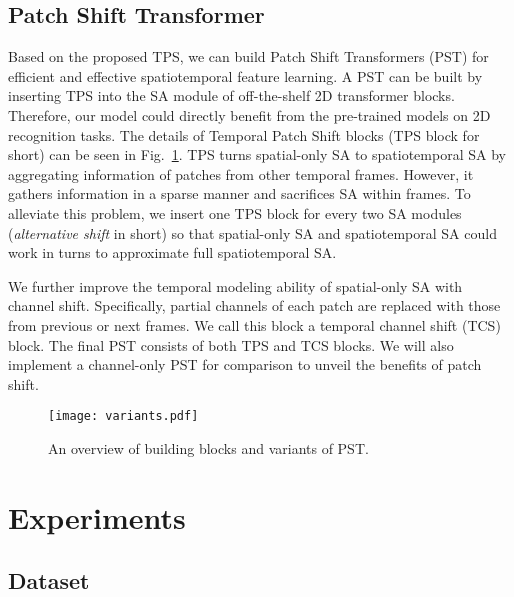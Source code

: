 \documentclass[runningheads]{llncs}
\begin{document}
	
	
	\subsection{Patch Shift Transformer} 
	
	Based on the proposed TPS, we can build Patch Shift Transformers (PST) for efficient and effective spatiotemporal feature learning. A PST can be built by inserting TPS into the SA module of off-the-shelf 2D transformer blocks. Therefore, our model could directly benefit from the pre-trained models on 2D recognition tasks. The details of Temporal Patch Shift blocks (TPS block for short) can be seen in Fig.~\ref{fig:variants}. TPS turns spatial-only SA to spatiotemporal SA by aggregating information of patches from other temporal frames. However, it gathers information in a sparse manner and sacrifices SA within frames. To alleviate this problem, we insert one TPS block for every two SA modules (\textit{alternative shift} in short) so that spatial-only SA and spatiotemporal SA could work in turns to approximate full spatiotemporal SA. 
	
	We further improve the temporal modeling ability of spatial-only SA with channel shift. Specifically, partial channels of each patch are replaced with those from previous or next frames. We call this block a temporal channel shift (TCS) block. The final PST consists of both TPS and TCS blocks. We will also implement a channel-only PST for comparison to unveil the benefits of patch shift.
	
	\begin{figure}[t]
		\setlength{\abovecaptionskip}{-1.mm}
		\setlength{\belowcaptionskip}{-1.mm}
		\begin{center}
			\texttt{[image: variants.pdf]}
		\end{center}
		\caption{
			An overview of building blocks and variants of PST.}\label{fig:variants}
		
	\end{figure}
	
	
	
	\section{Experiments}
	
	
	\subsection{Dataset}
	
\end{document}
